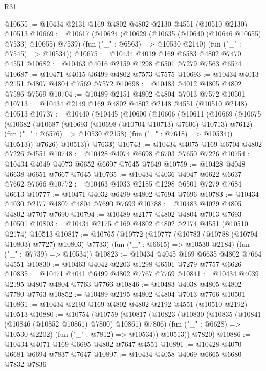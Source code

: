 \begin{lexlean}{R31}
\begin{coremodule}
@10655 := @10434 @2131 @169 @4802 @4802 @2130 @4551 (@10510 @2130) @10513
@10669 := @10617
    (@10624
      (@10629 (@10635 (@10640 (@10646 @10655) @7533) @10655) @7539)
      (fun ("_" : @6563) => @10530 @2140)
      (fun ("_" : @7545) => @10534))
@10675 := @10434 @4019 @169 @6583 @4802 @7470 @4551
@10682 := @10463 @4016 @2159 @1298 @6501 @7279 @7563 @6574
@10687 := @10471 @4015 @6499 @4802 @7573 @7575
@10693 := @10434 @4013 @2151 @4807 @4804 @7569 @7572
@10698 := @10483 @4012 @4805 @4802 @7586 @7569
@10704 := @10489 @2151 @4802 @4804 @7013 @7572 @10501
@10713 := @10434 @2149 @169 @4802 @4802 @2148 @4551 (@10510 @2148) @10513
@10737 := @10440
    (@10445
      (@10600
        (@10606
          (@10611
            (@10669
              (@10675
                (@10682
                  (@10687 (@10693 (@10698 (@10704 @10713) @7606) @10713) @7612)
                  (fun ("_" : @6576) => @10530 @2158)
                  (fun ("_" : @7618) => @10534))
                @10513))
            @7626)
          @10513))
      @7633)
@10743 := @10434 @4075 @169 @6704 @4802 @7226 @4551
@10748 := @10428 @4074 @6698 @6703 @7650 @7226
@10754 := @10434 @4049 @4073 @6652 @6697 @7645 @7649
@10759 := @10428 @4048 @6638 @6651 @7667 @7645
@10765 := @10434 @4036 @4047 @6622 @6637 @7662 @7666
@10772 := @10463 @4033 @2185 @1298 @6501 @7279 @7684 @6613
@10777 := @10471 @4032 @6499 @4802 @7694 @7696
@10783 := @10434 @4030 @2177 @4807 @4804 @7690 @7693
@10788 := @10483 @4029 @4805 @4802 @7707 @7690
@10794 := @10489 @2177 @4802 @4804 @7013 @7693 @10501
@10803 := @10434 @2175 @169 @4802 @4802 @2174 @4551 (@10510 @2174) @10513
@10817 := @10765
    (@10772
      (@10777 (@10783 (@10788 (@10794 @10803) @7727) @10803) @7733)
      (fun ("_" : @6615) => @10530 @2184)
      (fun ("_" : @7739) => @10534))
@10823 := @10434 @4045 @169 @6635 @4802 @7664 @4551
@10830 := @10463 @4042 @2203 @1298 @6501 @7279 @7757 @6626
@10835 := @10471 @4041 @6499 @4802 @7767 @7769
@10841 := @10434 @4039 @2195 @4807 @4804 @7763 @7766
@10846 := @10483 @4038 @4805 @4802 @7780 @7763
@10852 := @10489 @2195 @4802 @4804 @7013 @7766 @10501
@10861 := @10434 @2193 @169 @4802 @4802 @2192 @4551 (@10510 @2192) @10513
@10880 := @10754
    (@10759
      (@10817
        (@10823
          (@10830
            (@10835 (@10841 (@10846 (@10852 @10861) @7800) @10861) @7806)
            (fun ("_" : @6628) => @10530 @2202)
            (fun ("_" : @7812) => @10534))
          @10513))
      @7820)
@10886 := @10434 @4071 @169 @6695 @4802 @7647 @4551
@10891 := @10428 @4070 @6681 @6694 @7837 @7647
@10897 := @10434 @4058 @4069 @6665 @6680 @7832 @7836

\end{coremodule}
\end{lexlean}
